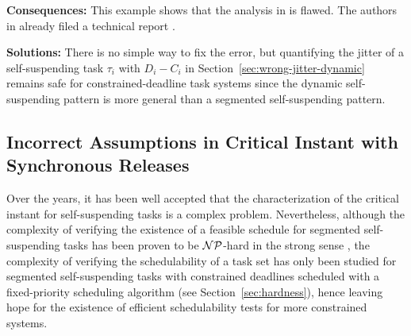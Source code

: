 
{\bf Consequences:} This example shows that the analysis in \cite{RTCSA-BletsasA05} is flawed.  The authors in \cite{RTCSA-BletsasA05}  already filed a technical report \cite{BletsasReport2015}.

{\bf Solutions:} There is no simple way to fix the error, but quantifying the jitter of a self-suspending task $\tau_i$ with $D_i-C_i$ in Section~\ref{sec:wrong-jitter-dynamic}  remains safe for constrained-deadline task systems since the dynamic self-suspending pattern is more general than a segmented self-suspending pattern.

\subsection{Incorrect Assumptions in Critical Instant with Synchronous Releases}
\label{sec:wrong-critical}

Over the years, it has been well accepted that the characterization of the critical instant for self-suspending tasks is a complex problem. Nevertheless, although the complexity of verifying the existence of a feasible schedule for segmented self-suspending tasks has been proven to be ${\cal NP}$-hard in the strong sense \cite{Ridouard_2004}, the complexity of verifying the schedulability of a task set has only been studied for segmented self-suspending tasks with constrained deadlines scheduled with a fixed-priority scheduling algorithm (see Section~\ref{sec:hardness}), hence leaving hope for the existence of efficient schedulability tests for more constrained systems. 

